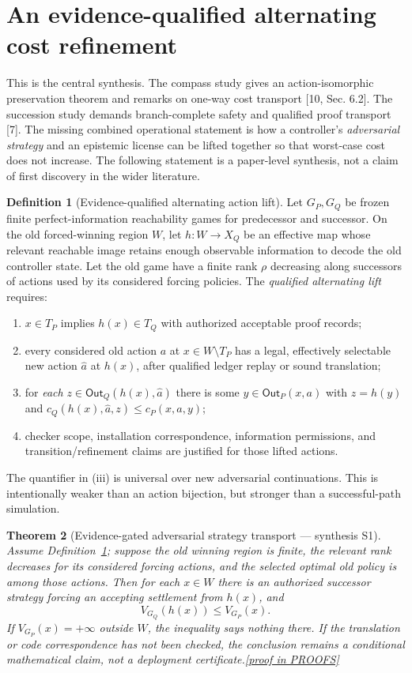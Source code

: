 \documentclass[11pt,letterpaper]{article}
\newtheorem{theorem}{Theorem}[section]
\theoremstyle{definition}
\newtheorem{definition}[theorem]{Definition}
\theoremstyle{remark}
\newcommand{\Out}{\mathsf{Out}}
\newcommand{\prooflink}[1]{\hfill\hyperlink{proof:#1}{\footnotesize[proof in PROOFS]}}
\newcommand{\src}[1]{\textup{[#1]}}
\begin{document}
\section{An evidence-qualified alternating cost refinement}
This is the central synthesis. The compass study gives an action-isomorphic preservation theorem and remarks on one-way cost transport \src{10, Sec. 6.2}. The succession study demands branch-complete safety and qualified proof transport \src{7}. The missing combined operational statement is how a controller's \emph{adversarial strategy} and an epistemic license can be lifted together so that worst-case cost does not increase. The following statement is a paper-level synthesis, not a claim of first discovery in the wider literature.

\begin{definition}[Evidence-qualified alternating action lift]\label{def:lift}
Let $G_P,G_Q$ be frozen finite perfect-information reachability games for predecessor and successor. On the old forced-winning region $W$, let $h:W\to X_Q$ be an effective map whose relevant reachable image retains enough observable information to decode the old controller state. Let the old game have a finite rank $\rho$ decreasing along successors of actions used by its considered forcing policies. The \emph{qualified alternating lift} requires:
\begin{enumerate}[label=(\roman*),leftmargin=2em]
\item $x\in T_P$ implies $h(x)\in T_Q$ with authorized acceptable proof records;
\item every considered old action $a$ at $x\in W\setminus T_P$ has a legal, effectively selectable new action $\widehat a$ at $h(x)$, after qualified ledger replay or sound translation;
\item for \emph{each} $z\in\Out_Q(h(x),\widehat a)$ there is some $y\in\Out_P(x,a)$ with $z=h(y)$ and $c_Q(h(x),\widehat a,z)\leq c_P(x,a,y)$;
\item checker scope, installation correspondence, information permissions, and transition/refinement claims are justified for those lifted actions.
\end{enumerate}
The quantifier in (iii) is universal over new adversarial continuations. This is intentionally weaker than an action bijection, but stronger than a successful-path simulation.
\end{definition}

\begin{theorem}[Evidence-gated adversarial strategy transport --- synthesis S1]\label{thm:lift}\hypertarget{claim:lift}{}
Assume Definition~\ref{def:lift}; suppose the old winning region is finite, the relevant rank decreases for its considered forcing actions, and the selected optimal old policy is among those actions. Then for each $x\in W$ there is an authorized successor strategy forcing an accepting settlement from $h(x)$, and
\[
                        V_{G_Q}(h(x))\leq V_{G_P}(x).
\]
If $V_{G_P}(x)=+\infty$ outside $W$, the inequality says nothing there. If the translation or code correspondence has not been checked, the conclusion remains a conditional mathematical claim, not a deployment certificate.\prooflink{lift}
\end{theorem}
\end{document}
